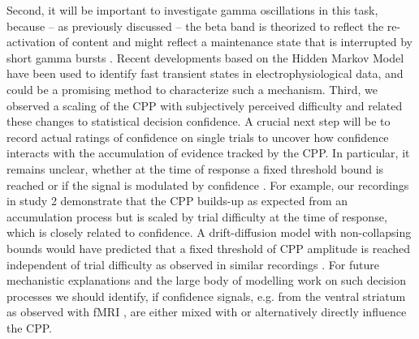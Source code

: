 Second, it will be important to investigate gamma oscillations in this task, because – as previously discussed – the beta band is theorized to reflect the re-activation of content \parencite{Spitzer2017} and might reflect a maintenance state that is interrupted by short gamma bursts \parencite{Lundqvist2018,Lundqvist2016}. Recent developments based on the Hidden Markov Model \parencite{Vidaurre2018,Vidaurre2016} have been used to identify fast transient states in electrophysiological data, and could be a promising method to characterize such a mechanism. 
Third, we observed a scaling of the CPP with subjectively perceived difficulty and related these changes to statistical decision confidence. A crucial next step will be to record actual ratings of confidence on single trials to uncover how confidence interacts with the accumulation of evidence tracked by the CPP. In particular, it remains unclear, whether at the time of response a fixed threshold bound is reached or if the signal is modulated by confidence \parencite{Gherman2015,Kelly2013,Kelly2015,Philiastides2014,Twomey2016}. For example, our recordings in study 2 demonstrate that the CPP builds-up as expected from an accumulation process but is scaled by trial difficulty at the time of response, which is closely related to confidence. A drift-diffusion model with non-collapsing bounds would have predicted that a fixed threshold of CPP amplitude is reached independent of trial difficulty as observed in similar recordings \parencite{Kelly2013}. For future mechanistic explanations and the large body of modelling work on such decision processes we should identify, if confidence signals, e.g. from the ventral striatum as observed with fMRI \parencite{Hebart2016}, are either mixed with or alternatively directly influence the CPP. 

